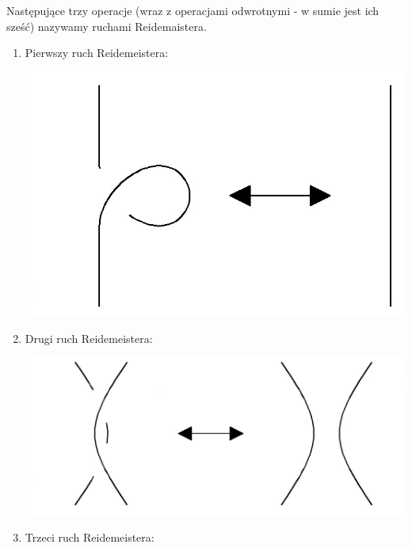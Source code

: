 \begin{definicja}
 Następujące trzy operacje (wraz z operacjami odwrotnymi - w sumie jest ich sześć) nazywamy ruchami Reidemaistera.
 
	\begin{enumerate} 

\item Pierwszy ruch Reidemeistera: 
	
	\begin{minipage}{0.5\textwidth}
		\begin{center}
			\includegraphics[scale=0.2]{1/pictures/R1}
		\end{center}
	\end{minipage}
\item Drugi ruch Reidemeistera: 

	\begin{minipage}{0.5\textwidth}
		\begin{center}
			\includegraphics[scale=0.2]{1/pictures/R2}
		\end{center}
	\end{minipage}
	
\item Trzeci ruch Reidemeistera: 


\end{enumerate}
\end{definicja}

